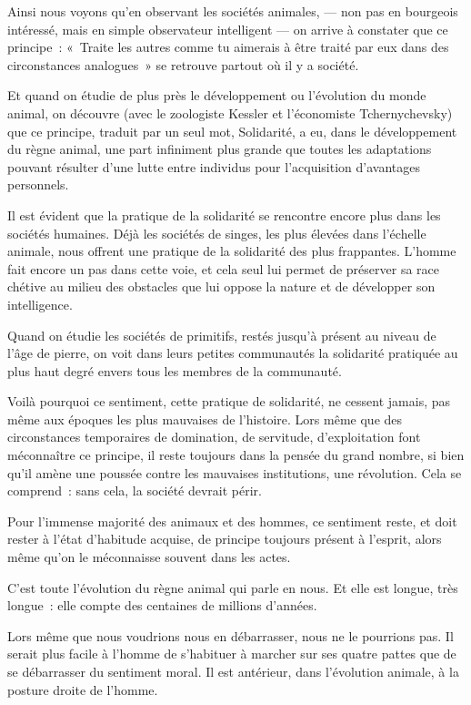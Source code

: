 \documentclass[french,twoside]{book} %
\begin{document}
\noindent Ainsi nous voyons qu’en observant les sociétés animales, — non pas en bourgeois intéressé, mais en simple observateur intelligent — on arrive à constater que ce principe : « Traite les autres comme tu aimerais à être traité par eux dans des circonstances analogues » se retrouve partout où il y a société.\par
Et quand on étudie de plus près le développement ou l’évolution du monde animal, on découvre (avec le zoologiste Kessler et l’économiste Tchernychevsky) que ce principe, traduit par un seul mot, Solidarité, a eu, dans le développement du règne animal, une part infiniment plus grande que toutes les adaptations pouvant résulter d’une lutte entre individus pour l’acquisition d’avantages personnels.\par
Il est évident que la pratique de la solidarité se rencontre encore plus dans les sociétés humaines. Déjà les sociétés de singes, les plus élevées dans l’échelle animale, nous offrent une pratique de la solidarité des plus frappantes. L’homme fait encore un pas dans cette voie, et cela seul lui permet de préserver sa race chétive au milieu des obstacles que lui oppose la nature et de développer son intelligence.\par
Quand on étudie les sociétés de primitifs, restés jusqu’à présent au  niveau de l’âge de pierre, on voit dans leurs petites communautés la solidarité pratiquée au plus haut degré envers tous les membres de la communauté.\par
\bigbreak
\noindent Voilà pourquoi ce sentiment, cette pratique de solidarité, ne cessent jamais, pas même aux époques les plus mauvaises de l’histoire. Lors même que des circonstances temporaires de domination, de servitude, d’exploitation font méconnaître ce principe, il reste toujours dans la pensée du grand nombre, si bien qu’il amène une poussée contre les mauvaises institutions, une révolution. Cela se comprend : sans cela, la société devrait périr.\par
Pour l’immense majorité des animaux et des hommes, ce sentiment reste, et doit rester à l’état d’habitude acquise, de principe toujours présent à l’esprit, alors même qu’on le méconnaisse souvent dans les actes.\par
C’est toute l’évolution du règne animal qui parle en nous. Et elle est longue, très longue : elle compte des centaines de millions d’années.\par
Lors même que nous voudrions nous en débarrasser, nous ne le pourrions pas. Il serait plus facile à l’homme de s’habituer à marcher sur ses quatre pattes que de se débarrasser du sentiment moral. Il est antérieur, dans l’évolution animale, à la posture droite de l’homme.\par
\end{document}
